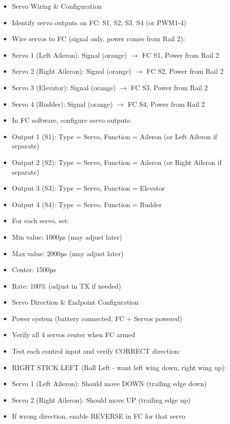 \documentclass[11pt,letterpaper]{article}
\begin{document}
\begin{itemize}
  \item Servo Wiring \& Configuration
  \item Identify servo outputs on FC: S1, S2, S3, S4 (or PWM1-4)
  \item Wire servos to FC (signal only, power comes from Rail 2):
  \item Servo 1 (Left Aileron):  Signal (orange) $\rightarrow$ FC S1,  Power from Rail 2
  \item Servo 2 (Right Aileron): Signal (orange) $\rightarrow$ FC S2,  Power from Rail 2
  \item Servo 3 (Elevator):      Signal (orange) $\rightarrow$ FC S3,  Power from Rail 2
  \item Servo 4 (Rudder):        Signal (orange) $\rightarrow$ FC S4,  Power from Rail 2
  \item In FC software, configure servo outputs:
  \item Output 1 (S1): Type = Servo, Function = Aileron (or Left Aileron if separate)
  \item Output 2 (S2): Type = Servo, Function = Aileron (or Right Aileron if separate)
  \item Output 3 (S3): Type = Servo, Function = Elevator
  \item Output 4 (S4): Type = Servo, Function = Rudder
  \item For each servo, set:
  \item Min value: 1000µs (may adjust later)
  \item Max value: 2000µs (may adjust later)
  \item Center: 1500µs
  \item Rate: 100\% (adjust in TX if needed)
\end{itemize}

\begin{itemize}
  \item Servo Direction \& Endpoint Configuration
  \item Power system (battery connected, FC + Servos powered)
  \item Verify all 4 servos center when FC armed
  \item Test each control input and verify CORRECT direction:
\end{itemize}

\begin{itemize}
  \item RIGHT STICK LEFT (Roll Left - want left wing down, right wing up):
  \item Servo 1 (Left Aileron): Should move DOWN (trailing edge down)
  \item Servo 2 (Right Aileron): Should move UP (trailing edge up)
  \item If wrong direction, enable REVERSE in FC for that servo
\end{itemize}
\end{document}
